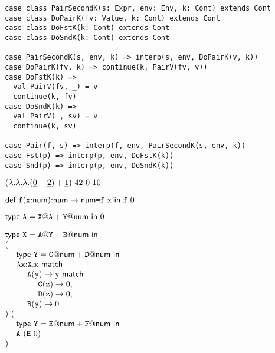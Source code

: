 \textbf{}
\vspace{-1em}
\begin{verbatim}
case class PairSecondK(s: Expr, env: Env, k: Cont) extends Cont
case class DoPairK(fv: Value, k: Cont) extends Cont
case class DoFstK(k: Cont) extends Cont
case class DoSndK(k: Cont) extends Cont

case PairSecondK(s, env, k) => interp(s, env, DoPairK(v, k))
case DoPairK(fv, k) => continue(k, PairV(fv, v))
case DoFstK(k) =>
  val PairV(fv, _) = v
  continue(k, fv)
case DoSndK(k) =>
  val PairV(_, sv) = v
  continue(k, sv)

case Pair(f, s) => interp(f, env, PairSecondK(s, env, k))
case Fst(p) => interp(p, env, DoFstK(k))
case Snd(p) => interp(p, env, DoSndK(k))
\end{verbatim}

\textbf{}

$(\lambda.\lambda.\lambda.(\underline{0}-\underline{2})+\underline{1})\ 42\ 0\ 10$
\\

\textbf{}

$\textsf{def}\ \texttt{f}(\texttt{x}{:}\textsf{num}){:}\textsf{num}\rightarrow\textsf{num}\texttt{=}\texttt{f}\ \texttt{x}\ \textsf{in}\ \texttt{f}\ 0$
\\

\textbf{}

$\etdef{\code{A}}{\cX}{\code{A}}{\cY}{\tnum}{0}$
\\

\textbf{}

$\begin{array}{@{}l}
  \etdef{\cX}{\code{A}}{\code{Y}}{\code{B}}{\tnum}{ \\
  \eapp{( \\
  \ \ \ \ \etdef{\cY}{\code{C}}{\tnum}{\code{D}}{\tnum}{ \\
  \ \ \ \ \efunt{\cx}{\cX}{\ematch{\cx}{ \\
  \ \ \ \ \ \ \ \ \code{A}}{\cy}{\ematch{\cy}{ \\
  \ \ \ \ \ \ \ \ \ \ \ \ \code{C}}{\cz}{0}{ \\
  \ \ \ \ \ \ \ \ \ \ \ \ \code{D}}{\cz}{0}}{ \\
  \ \ \ \ \ \ \ \ \code{B}}{\cy}{0}} \\
  })}{( \\
  \ \ \ \ \etdef{\cY}{\code{E}}{\tnum}{\code{F}}{\tnum}{ \\
  \ \ \ \ \eapp{\code{A}}{(\eapp{\code{E}}{0})} \\
  })}}
\end{array}$

